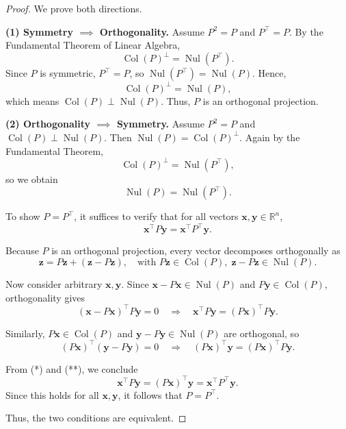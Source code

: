\begin{proof}
We prove both directions.

\medskip
\noindent\textbf{(1) Symmetry \( \implies \) Orthogonality.}  
Assume \( P^2 = P \) and \( P^\top = P \).  
By the Fundamental Theorem of Linear Algebra,
\[
\operatorname{Col}(P)^\perp = \operatorname{Nul}(P^\top).
\]
Since \( P \) is symmetric, \( P^\top = P \), so \( \operatorname{Nul}(P^\top) = \operatorname{Nul}(P) \). Hence,
\[
\operatorname{Col}(P)^\perp = \operatorname{Nul}(P),
\]
which means \( \operatorname{Col}(P) \perp \operatorname{Nul}(P) \). Thus, \( P \) is an orthogonal projection.

\medskip
\noindent\textbf{(2) Orthogonality \( \implies \) Symmetry.}  
Assume \( P^2 = P \) and \( \operatorname{Col}(P) \perp \operatorname{Nul}(P) \).  
Then \( \operatorname{Nul}(P) = \operatorname{Col}(P)^\perp \). Again by the Fundamental Theorem,
\[
\operatorname{Col}(P)^\perp = \operatorname{Nul}(P^\top),
\]
so we obtain
\[
\operatorname{Nul}(P) = \operatorname{Nul}(P^\top).
\]

To show \( P = P^\top \), it suffices to verify that for all vectors \( \mathbf{x}, \mathbf{y} \in \mathbb{R}^n \),
\[
\mathbf{x}^\top P \mathbf{y} = \mathbf{x}^\top P^\top \mathbf{y}.
\]

Because \( P \) is an orthogonal projection, every vector decomposes orthogonally as
\[
\mathbf{z} = P\mathbf{z} + (\mathbf{z} - P\mathbf{z}), \quad \text{with } P\mathbf{z} \in \operatorname{Col}(P),\; \mathbf{z} - P\mathbf{z} \in \operatorname{Nul}(P).
\]

Now consider arbitrary \( \mathbf{x}, \mathbf{y} \). Since \( \mathbf{x} - P\mathbf{x} \in \operatorname{Nul}(P) \) and \( P\mathbf{y} \in \operatorname{Col}(P) \), orthogonality gives
\[
(\mathbf{x} - P\mathbf{x})^\top P\mathbf{y} = 0
\quad\Longrightarrow\quad
\mathbf{x}^\top P\mathbf{y} = (P\mathbf{x})^\top P\mathbf{y}. \tag{*}
\]

Similarly, \( P\mathbf{x} \in \operatorname{Col}(P) \) and \( \mathbf{y} - P\mathbf{y} \in \operatorname{Nul}(P) \) are orthogonal, so
\[
(P\mathbf{x})^\top (\mathbf{y} - P\mathbf{y}) = 0
\quad\Longrightarrow\quad
(P\mathbf{x})^\top \mathbf{y} = (P\mathbf{x})^\top P\mathbf{y}. \tag{**}
\]

From (*) and (**), we conclude
\[
\mathbf{x}^\top P\mathbf{y} = (P\mathbf{x})^\top \mathbf{y} = \mathbf{x}^\top P^\top \mathbf{y}.
\]
Since this holds for all \( \mathbf{x}, \mathbf{y} \), it follows that \( P = P^\top \).

\medskip
Thus, the two conditions are equivalent.
\end{proof}

